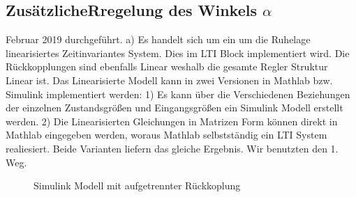\documentclass[10pt]{scrartcl}
\begin{document}








\newpage
\subsection{ZusätzlicheRregelung des Winkels $\alpha$ }
Februar 2019 durchgeführt.
a)	Es handelt sich um ein um die Ruhelage linearisiertes Zeitinvariantes System. Dies im LTI Block implementiert wird. Die Rückkopplungen sind ebenfalls Linear weshalb die gesamte Regler Struktur Linear ist.
Das Linearisierte Modell kann in zwei Versionen in Mathlab bzw. Simulink implementiert werden:
1) Es kann über die Verschiedenen Beziehungen der einzelnen Zustandsgrößen und Eingangsgrößen ein Simulink Modell erstellt werden.
2) Die Linearisierten Gleichungen in Matrizen Form können direkt in Mathlab eingegeben werden, woraus Mathlab selbstständig ein LTI System realiesiert. 
Beide Varianten liefern das gleiche Ergebnis.
Wir benutzten den 1. Weg. 
\begin{figure}  %
\caption{Simulink Modell mit aufgetrennter Rückkoplung} 
\end{figure}
\end{document}
